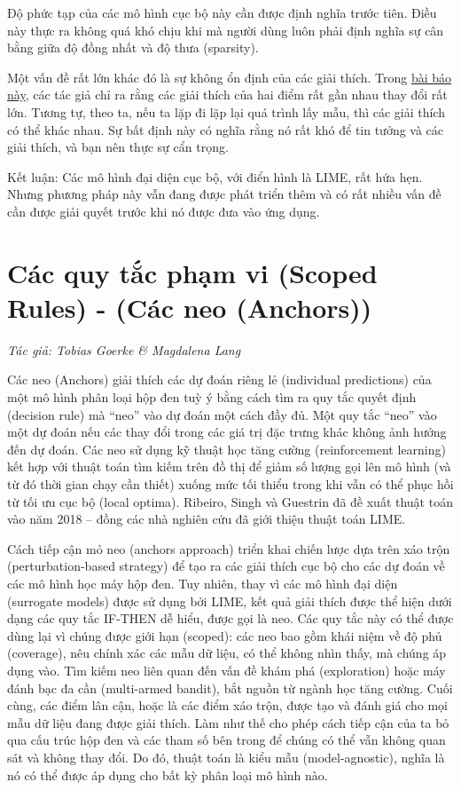 Độ phức tạp của các mô hình cục bộ này cần được định nghĩa trước tiên. Điều này thực ra không quá khó chịu khi mà người dùng luôn phải định nghĩa sự cân bằng giữa độ đồng nhất và độ thưa (sparsity).

Một vấn đề rất lớn khác đó là sự không ổn định của các giải thích. Trong \href{https://christophm.github.io/interpretable-ml-book/lime.html#fn35}{bài báo này}, các tác giả chỉ ra rằng các giải thích của hai điểm rất gần nhau thay đổi rất lớn. Tương tự, theo ta, nếu ta lặp đi lặp lại quá trình lấy mẫu, thì các giải thích có thể khác nhau. Sự bất định này có nghĩa rằng nó rất khó để tin tưởng và các giải thích, và bạn nên thực sự cẩn trọng.

Kết luận: Các mô hình đại diện cục bộ, với điển hình là LIME, rất hứa hẹn. Nhưng phương pháp này vẫn đang được phát triển thêm và có rất nhiều vấn đề cần được giải quyết trước khi nó được đưa vào ứng dụng.

\clearpage
\section{Các quy tắc phạm vi (Scoped Rules) - (Các neo (Anchors))}\label{Chap_5.8}
\textit{Tác giả: Tobias Goerke \& Magdalena Lang}

Các neo (Anchors) giải thích các dự đoán riêng lẻ (individual predictions) của một mô hình phân loại hộp đen tuỳ ý bằng cách tìm ra quy tắc quyết định (decision rule) mà ``neo'' vào dự đoán một cách đầy đủ. Một quy tắc ``neo'' vào một dự đoán nếu các thay đổi trong các giá trị đặc trưng khác không ảnh hưởng đến dự đoán. Các neo sử dụng kỹ thuật học tăng cường (reinforcement learning) kết hợp với thuật toán tìm kiếm trên đồ thị để giảm số lượng gọi lên mô hình (và từ đó thời gian chạy cần thiết) xuống mức tối thiểu trong khi vẫn có thể phục hồi từ tối ưu cục bộ (local optima). Ribeiro, Singh và Guestrin đã đề xuất thuật toán vào năm 2018 – đồng các nhà nghiên cứu đã giới thiệu thuật toán LIME.

Cách tiếp cận mỏ neo (anchors approach) triển khai chiến lược dựa trên xáo trộn (perturbation-based strategy) để tạo ra các giải thích cục bộ cho các dự đoán về các mô hình học máy hộp đen. Tuy nhiên, thay vì các mô hình đại diện (surrogate models) được sử dụng bởi LIME, kết quả giải thích được thể hiện dưới dạng các quy tắc IF-THEN dễ hiểu, được gọi là neo. Các quy tắc này có thể được dùng lại vì chúng được giới hạn (scoped): các neo bao gồm khái niệm về độ phủ (coverage), nêu chính xác các mẫu dữ liệu, có thể không nhìn thấy, mà chúng áp dụng vào. Tìm kiếm neo liên quan đến vấn đề khám phá (exploration) hoặc máy đánh bạc đa cần (multi-armed bandit), bắt nguồn từ ngành học tăng cường. Cuối cùng, các điểm lân cận, hoặc là các điểm xáo trộn, được tạo và đánh giá cho mọi mẫu dữ liệu đang được giải thích. Làm như thế cho phép cách tiếp cận của ta bỏ qua cấu trúc hộp đen và các tham số bên trong để chúng có thể vẫn không quan sát và không thay đổi. Do đó, thuật toán là kiểu mẫu (model-agnostic), nghĩa là nó có thể được áp dụng cho bất kỳ phân loại mô hình nào.

